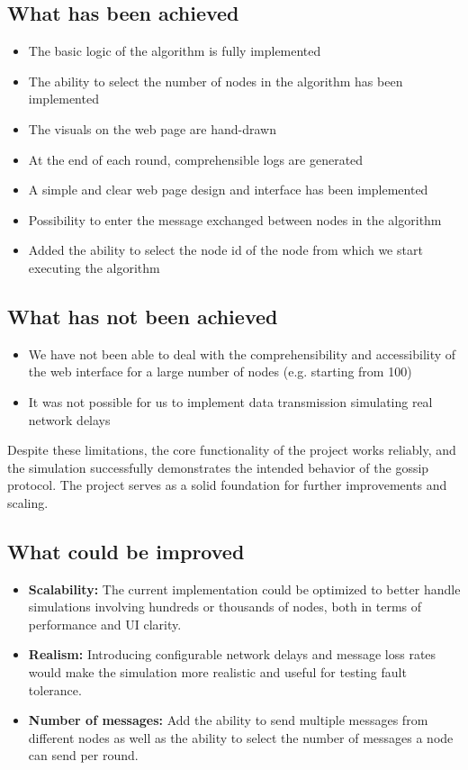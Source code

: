 \documentclass[a4paper,12pt]{article}
\begin{document}
\subsection{What has been achieved}
\begin{itemize}
    \item The basic logic of the algorithm is fully implemented
    \item The ability to select the number of nodes in the algorithm has been implemented
    \item The visuals on the web page are hand-drawn
    \item At the end of each round, comprehensible logs are generated
    \item A simple and clear web page design and interface has been implemented
    \item Possibility to enter the message exchanged between nodes in the algorithm
    \item Added the ability to select the node id of the node from which we start executing the algorithm
\end{itemize}

\subsection{What has not been achieved}
\begin{itemize}
    \item We have not been able to deal with the comprehensibility and accessibility of the web interface for a large number of nodes (e.g. starting from 100)
    \item It was not possible for us to implement data transmission simulating real network delays
\end{itemize}
Despite these limitations, the core functionality of the project works reliably, and the simulation successfully demonstrates the intended behavior of the gossip protocol. The project serves as a solid foundation for further improvements and scaling.

\subsection{What could be improved}
\begin{itemize}
    \item \textbf{Scalability:} The current implementation could be optimized to better handle simulations involving hundreds or thousands of nodes, both in terms of performance and UI clarity.
    \item \textbf{Realism:} Introducing configurable network delays and message loss rates would make the simulation more realistic and useful for testing fault tolerance.
    \item \textbf{Number of messages:} Add the ability to send multiple messages from different nodes as well as the ability to select the number of messages a node can send per round.
\end{itemize}
\end{document}
